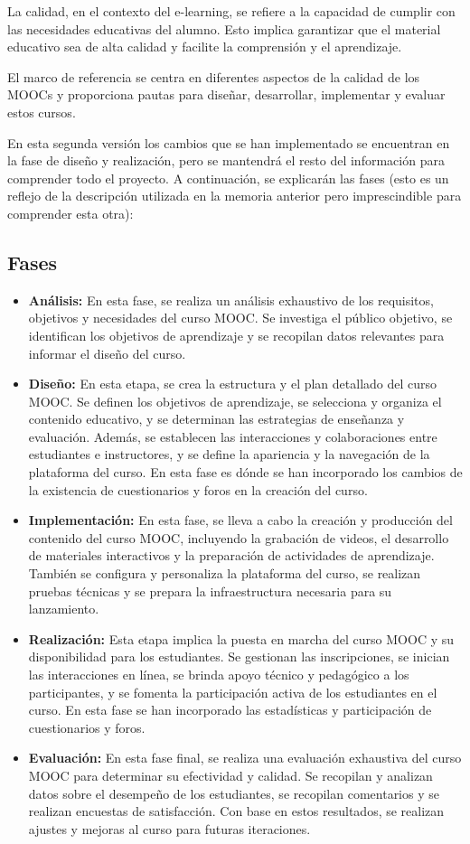 La calidad, en el contexto del e-learning, se refiere a la capacidad de cumplir con las necesidades educativas del alumno. Esto implica garantizar que el material educativo sea de alta calidad y facilite la comprensión y el aprendizaje.

El marco de referencia se centra en diferentes aspectos de la calidad de los MOOCs y proporciona pautas para diseñar, desarrollar, implementar y evaluar estos cursos.

En esta segunda versión los cambios que se han implementado se encuentran en la fase de diseño y realización, pero se mantendrá el resto del información para comprender todo el proyecto. A continuación, se explicarán las fases (esto es un reflejo de la descripción utilizada en la memoria anterior pero imprescindible para comprender esta otra):

\subsection{Fases}
\begin{itemize}
	\item \textbf{Análisis:}
	En esta fase, se realiza un análisis exhaustivo de los requisitos, objetivos y necesidades del curso MOOC. Se investiga el público objetivo, se identifican los objetivos de aprendizaje y se recopilan datos relevantes para informar el diseño del curso.
	\item \textbf{Diseño:}
	En esta etapa, se crea la estructura y el plan detallado del curso MOOC. Se definen los objetivos de aprendizaje, se selecciona y organiza el contenido educativo, y se determinan las estrategias de enseñanza y evaluación. Además, se establecen las interacciones y colaboraciones entre estudiantes e instructores, y se define la apariencia y la navegación de la plataforma del curso. En esta fase es dónde se han incorporado los cambios de la existencia de cuestionarios y foros en la creación del curso.
	\item \textbf{Implementación:}
	En esta fase, se lleva a cabo la creación y producción del contenido del curso MOOC, incluyendo la grabación de videos, el desarrollo de materiales interactivos y la preparación de actividades de aprendizaje. También se configura y personaliza la plataforma del curso, se realizan pruebas técnicas y se prepara la infraestructura necesaria para su lanzamiento.
	\item \textbf{Realización:}
	Esta etapa implica la puesta en marcha del curso MOOC y su disponibilidad para los estudiantes. Se gestionan las inscripciones, se inician las interacciones en línea, se brinda apoyo técnico y pedagógico a los participantes, y se fomenta la participación activa de los estudiantes en el curso. En esta fase se han incorporado las estadísticas y participación de cuestionarios y foros.
	\item \textbf{Evaluación:}
	En esta fase final, se realiza una evaluación exhaustiva del curso MOOC para determinar su efectividad y calidad. Se recopilan y analizan datos sobre el desempeño de los estudiantes, se recopilan comentarios y se realizan encuestas de satisfacción. Con base en estos resultados, se realizan ajustes y mejoras al curso para futuras iteraciones.
\end{itemize}

